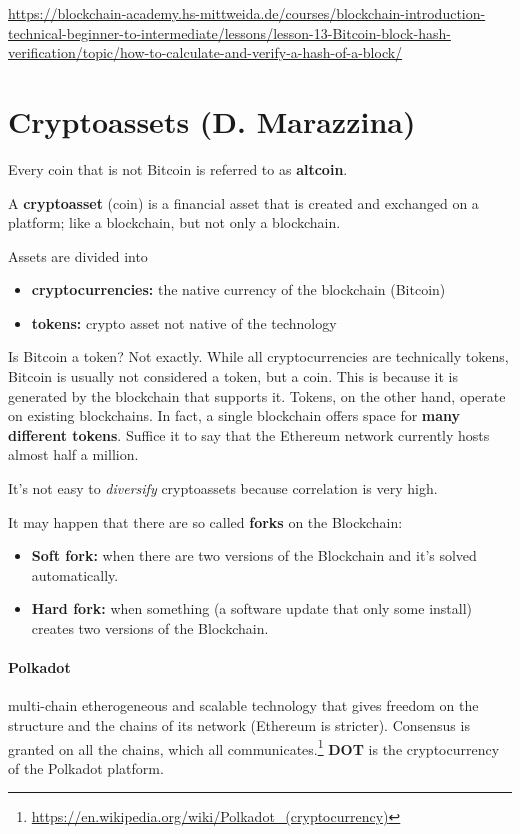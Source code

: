 {\scriptsize\url{https://blockchain-academy.hs-mittweida.de/courses/blockchain-introduction-technical-beginner-to-intermediate/lessons/lesson-13-Bitcoin-block-hash-verification/topic/how-to-calculate-and-verify-a-hash-of-a-block/}}

\section{Cryptoassets (D. Marazzina)}

Every coin that is not Bitcoin is referred to as \textbf{altcoin}.

A \textbf{cryptoasset} (coin) is a financial asset that is created and exchanged on a platform; like a blockchain, but not only a blockchain.

Assets are divided into
\begin{itemize}
	\item \textbf{cryptocurrencies:} the native currency of the blockchain (Bitcoin)
	\item \textbf{tokens:} crypto asset not native of the technology
\end{itemize}

Is Bitcoin a token? Not exactly. While all cryptocurrencies are technically tokens, Bitcoin is usually not considered a token, but a coin. This is because it is generated by the blockchain that supports it. Tokens, on the other hand, operate on existing blockchains. In fact, a single blockchain offers space for \textbf{many different tokens}. Suffice it to say that the Ethereum network currently hosts almost half a million.

It's not easy to \textit{diversify} cryptoassets because correlation is very high.

It may happen that there are so called \textbf{forks} on the Blockchain:
\begin{itemize}
	\item \textbf{Soft fork:} when there are two versions of the Blockchain and it's solved automatically.
	\item \textbf{Hard fork:} when something (a software update that only some install) creates two versions of the Blockchain.
\end{itemize}

\paragraph{Polkadot} multi-chain etherogeneous and scalable technology that gives freedom on the structure and the chains of its network (Ethereum is stricter). Consensus is granted on all the chains, which all communicates.\footnote{\url{https://en.wikipedia.org/wiki/Polkadot_(cryptocurrency)}}
\textbf{DOT} is the cryptocurrency of the Polkadot platform.

